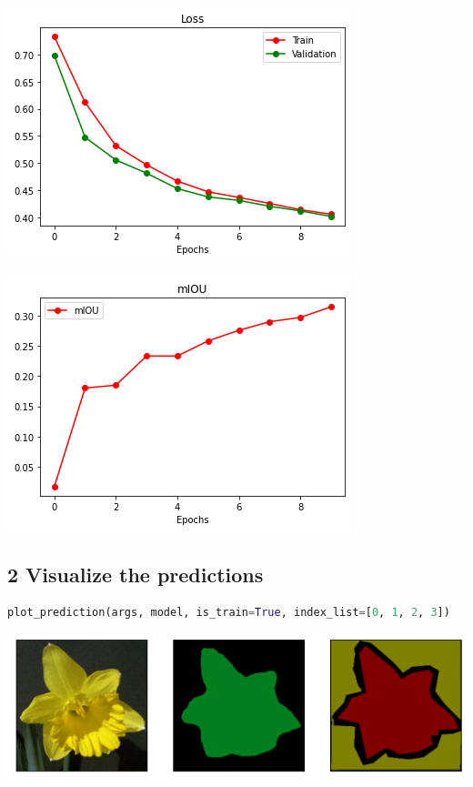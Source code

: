 \documentclass{article}
\begin{document}
\includegraphics{D2-1.1.png}

\includegraphics{D2-1.2.png}

\subsection*{2 Visualize the predictions}




\begin{lstlisting}[language=Python]
plot_prediction(args, model, is_train=True, index_list=[0, 1, 2, 3])
\end{lstlisting}

\includegraphics[width=\textwidth]{D2-2.1.1.png}
\end{document}
